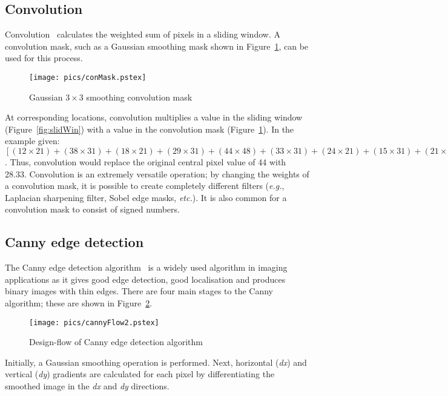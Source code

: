 \documentclass[10pt,twocolumn,letterpaper]{article}
\begin{document}
\subsection{Convolution}
Convolution~\cite{russbk} calculates the weighted sum of pixels in a sliding window.
A convolution mask, such as a Gaussian smoothing mask shown in Figure~\ref{fig:conMask}, can be used for this process.
\begin{figure}[!htb]
\begin{center}
\setlength{\abovecaptionskip}{-0.25cm}
        \texttt{[image: pics/conMask.pstex]}
        \caption{Gaussian $3\times3$ smoothing convolution mask}
        \label{fig:conMask}
\setlength{\abovecaptionskip}{0cm}
\end{center}
\end{figure}
At corresponding locations, convolution multiplies a value in the sliding window (Figure~\ref{fig:slidWin}) with a value 
in the convolution mask (Figure~\ref{fig:conMask}). In the example given:
$[(12\times21)+(38\times31)+(18\times21)+
(29\times31)+(44\times48)+(33\times31)+
(24\times21)+(15\times31)+(21\times21) ] / 256 = 7252/256 = 28.33$.
Thus, convolution would replace the original central pixel value of 44 with 28.33.
Convolution is an extremely versatile operation;
by changing the weights of a convolution mask, it is possible to create completely different filters (\emph{e.g.}, Laplacian 
sharpening filter, Sobel edge masks, \emph{etc.}). 
It is also common for a convolution mask to consist of signed numbers.

\subsection{Canny edge detection}
The Canny edge detection algorithm~\cite{russbk, canny86} is a widely used algorithm in imaging applications as
it gives good edge detection, good localisation
and produces binary images with thin edges.
There are four main stages to the Canny algorithm; these are shown in Figure~\ref{fig:cannyFlow2}.
\begin{figure}[!htb]
\begin{center}
\setlength{\abovecaptionskip}{-0.25cm}
        \texttt{[image: pics/cannyFlow2.pstex]}
        \caption{Design-flow of Canny edge detection algorithm}
        \label{fig:cannyFlow2}
\setlength{\abovecaptionskip}{0cm}
\end{center}
\end{figure}
Initially, a Gaussian smoothing operation is performed. 
Next, horizontal (\emph{dx}) and vertical (\emph{dy}) gradients are calculated 
for each pixel by differentiating the smoothed image in 
the \emph{dx} and \emph{dy} directions.  
\end{document}
